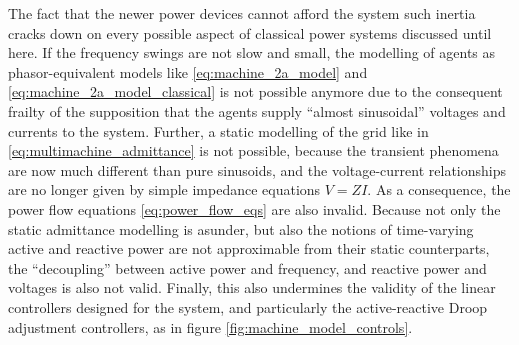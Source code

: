 
	The fact that the newer power devices cannot afford the system such inertia cracks down on every possible aspect of classical power systems discussed until here. If the frequency swings are not slow and small, the modelling of agents as phasor-equivalent models like \eqref{eq:machine_2a_model} and \eqref{eq:machine_2a_model_classical} is not possible anymore due to the consequent frailty of the supposition that the agents supply ``almost sinusoidal'' voltages and currents to the system. Further, a static modelling of the grid like in \eqref{eq:multimachine_admittance} is not possible, because the transient phenomena are now much different than pure sinusoids, and the voltage-current relationships are no longer given by simple impedance equations $V = ZI$. As a consequence, the power flow equations \eqref{eq:power_flow_eqs} are also invalid. Because not only the static admittance modelling is asunder, but also the notions of time-varying active and reactive power are not approximable from their static counterparts, the ``decoupling'' between active power and frequency, and reactive power and voltages is also not valid. Finally, this also undermines the validity of the linear controllers designed for the system, and particularly the active-reactive Droop adjustment controllers, as in figure \ref{fig:machine_model_controls}.

